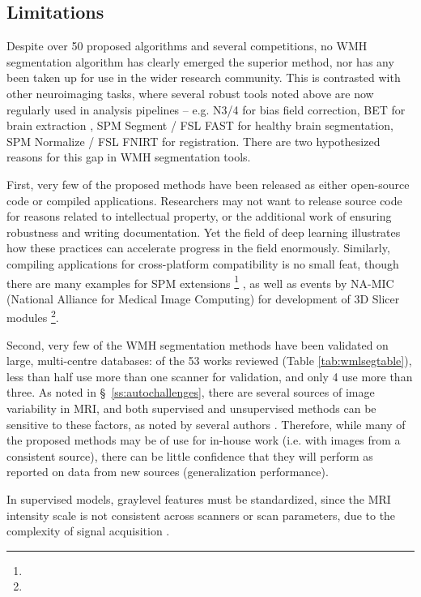 \subsection{Limitations}\label{ss:priorlimits}
Despite over 50 proposed algorithms and several competitions, no WMH segmentation algorithm has clearly emerged the superior method, nor has any been taken up for use in the wider research community.
This is contrasted with other neuroimaging tasks, where several robust tools noted above are now regularly used in analysis pipelines -- e.g.
N3/4 \cite{Tustison2010} for bias field correction,
BET for brain extraction \cite{Smith2002a},
SPM Segment \cite{Ashburner2005} / FSL FAST \cite{Zhang2001} for healthy brain segmentation,
SPM Normalize \cite{Ashburner2005} / FSL FNIRT \cite{Andersson2007} for registration.
There are two hypothesized reasons for this gap in WMH segmentation tools.
\par
First, very few of the proposed methods have been released as either open-source code or compiled applications.
Researchers may not want to release source code for reasons related to intellectual property, or the additional work of ensuring robustness and writing documentation.
Yet the field of deep learning illustrates how these practices can accelerate progress in the field enormously.
Similarly, compiling applications for cross-platform compatibility is no small feat, though there are many examples for SPM extensions%
\footnote{}%
, as well as events by NA-MIC (National Alliance for Medical Image Computing) for development of 3D Slicer modules%
\footnote{}.
\par
Second, very few of the WMH segmentation methods have been validated on large, multi-centre databases: of the 53 works reviewed (Table \ref{tab:wmlsegtable}), less than half use more than one scanner for validation, and only 4 use more than three.
As noted in \S\ \ref{ss:autochallenges}, there are several sources of image variability in MRI, and both supervised and unsupervised methods can be sensitive to these factors, as noted by several authors \cite{Llado2012,Sweeney2013,Dadar2017}.
Therefore, while many of the proposed methods may be of use for in-house work (i.e. with images from a consistent source), there can be little confidence that they will perform as reported on data from new sources (generalization performance).
\par
In supervised models, graylevel features must be standardized, since the MRI intensity scale is not consistent across scanners or scan parameters, due to the complexity of signal acquisition \cite{Nyul1999}.
